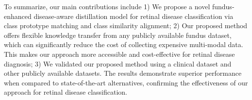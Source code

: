 \documentclass[runningheads]{llncs}
\begin{document}
To summarize, our main contributions include 1) We propose a novel fundus-enhanced disease-aware distillation model for retinal disease classification via class prototype matching and class similarity alignment; 2) Our proposed method offers flexible knowledge transfer from any publicly available fundus dataset, which can significantly reduce the cost of collecting expensive multi-modal data. This makes our approach more accessible and cost-effective for retinal disease diagnosis; 3) We validated our proposed method using a clinical dataset and other publicly available datasets. The results demonstrate superior performance when compared to state-of-the-art alternatives, confirming the effectiveness of our approach for retinal disease classification.

\end{document}
